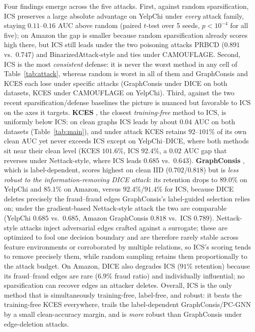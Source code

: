 \documentclass[11pt]{article}
\begin{document}
Four findings emerge across the five attacks. First, against random sparsification, ICS preserves a large absolute advantage on YelpChi under \emph{every} attack family, staying $0.11$--$0.16$ AUC above random (paired $t$-test over 5 seeds, $p<10^{-4}$ for all five); on Amazon the gap is smaller because random sparsification already scores high there, but ICS still leads under the two poisoning attacks PRBCD ($0.891$ vs.\ $0.747$) and BinarizedAttack-style and ties under CAMOUFLAGE. Second, ICS is the most \emph{consistent} defense: it is never the worst method in any cell of Table~\ref{tab:attack}, whereas random is worst in all of them and GraphConsis and KCES each lose under specific attacks (GraphConsis under DICE on both datasets, KCES under CAMOUFLAGE on YelpChi). Third, against the two recent sparsification/defense baselines the picture is nuanced but favorable to ICS on the axes it targets. \textbf{KCES} \cite{jia2026kces}, the closest \emph{training-free} method to ICS, is uniformly below ICS: on clean graphs ICS leads by about $0.04$ AUC on both datasets (Table~\ref{tab:main}), and under attack KCES retains $92$--$101\%$ of its own clean AUC yet never exceeds ICS except on YelpChi--DICE, where both methods sit near their clean level (KCES $101.6\%$, ICS $92.4\%$, a $0.02$ AUC gap that reverses under Nettack-style, where ICS leads $0.685$ vs.\ $0.643$). \textbf{GraphConsis} \cite{liu2020graphconsis}, which is label-dependent, scores highest on clean IID ($0.702$/$0.818$) but is \emph{less robust to the information-removing DICE attack}: its retention drops to $89.0\%$ on YelpChi and $85.1\%$ on Amazon, versus $92.4\%$/$91.4\%$ for ICS, because DICE deletes precisely the fraud--fraud edges GraphConsis's label-guided selection relies on; under the gradient-based Nettack-style attack the two are comparable (YelpChi $0.685$ vs.\ $0.685$, Amazon GraphConsis $0.818$ vs.\ ICS $0.789$). Nettack-style attacks inject adversarial edges crafted against a surrogate; these are optimized to fool one decision boundary and are therefore rarely stable across feature environments or corroborated by multiple relations, so ICS's scoring tends to remove precisely them, while random sampling retains them proportionally to the attack budget. On Amazon, DICE also degrades ICS ($91\%$ retention) because its fraud--fraud edges are rare ($6.9\%$ fraud ratio) and individually influential; no sparsification can recover edges an attacker deletes. Overall, ICS is the only method that is simultaneously training-free, label-free, and robust: it beats the training-free KCES everywhere, trails the label-dependent GraphConsis/PC-GNN by a small clean-accuracy margin, and is \emph{more} robust than GraphConsis under edge-deletion attacks.
\end{document}

